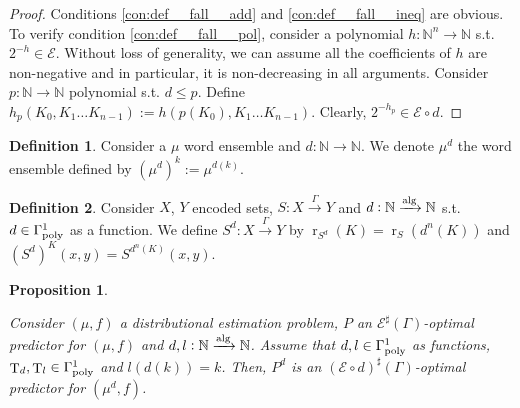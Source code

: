 \documentclass{article}
\numberwithin{equation}{section}
\theoremstyle{definition}
\newtheorem{definition}{Definition}[section]
\theoremstyle{plain}
\newtheorem{proposition}{Proposition}[section]
\DeclareMathOperator{\T}{T}
\DeclareMathOperator{\R}{r}
\newcommand{\Nats}{\mathbb{N}}
\newcommand{\Fall}{\mathcal{E}}
\newcommand{\ESG}{\Fall^\sharp(\Gamma)}
\newcommand{\Alg}{\xrightarrow{\textnormal{alg}}}
\newcommand{\Scheme}{\xrightarrow{\Gamma}}
\begin{document}
\begin{proof}

Conditions \ref{con:def__fall__add} and \ref{con:def__fall__ineq} are obvious. To verify condition \ref{con:def__fall__pol}, consider a polynomial ${h: \Nats^n \rightarrow \Nats}$ s.t. ${2^{-h} \in \Fall}$. Without loss of generality, we can assume all the coefficients of ${h}$ are non-negative and in particular, it is non-decreasing in all arguments. Consider ${p: \Nats \rightarrow \Nats}$ polynomial s.t. ${d \leq p}$. Define ${h_p(K_0, K_1 \ldots K_{n-1}):=h(p(K_0),K_1 \ldots K_{n-1})}$. Clearly, ${2^{-h_p} \in \Fall \circ d}$.
%
\end{proof}

\begin{samepage}
\begin{definition}

Consider a ${\mu}$ word ensemble and ${d: \Nats \rightarrow \Nats}$. We denote ${\mu^d}$ the word ensemble defined by ${(\mu^d)^k:=\mu^{d(k)}}$.

\end{definition}
\end{samepage}

\begin{samepage}
\begin{definition}

Consider ${X}$, ${Y}$ encoded sets, ${S: X \Scheme Y}$ and ${d: \Nats \Alg \Nats}$ s.t. ${d \in \Gamma_{\textnormal{poly}}^1}$ as a function. We define ${S^d: X \Scheme Y}$ by ${\R_{S^d}(K)=\R_S(d^n(K))}$ and ${(S^d)^K(x,y)=S^{d^n(K)}(x,y)}$.

\end{definition}
\end{samepage}

\begin{samepage}
\begin{proposition}
\label{prp:idx_reduce_sharp}

Consider $(\mu,f)$ a distributional estimation problem, ${P}$ an ${\ESG}$-optimal predictor for ${(\mu,f)}$ and ${d,l: \Nats \Alg \Nats}$. Assume that ${d,l \in \Gamma_{\textnormal{poly}}^1}$ as functions, ${\T_d, \T_l \in \Gamma_{\textnormal{poly}}^1}$ and ${l(d(k))=k}$. Then, ${P^d}$ is an ${(\Fall \circ d)^\sharp(\Gamma)}$-optimal predictor for ${(\mu^d,f)}$.

\end{proposition}
\end{samepage}
\end{document}
